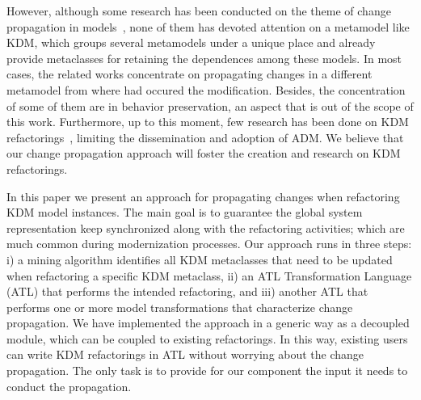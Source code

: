 However, although some research has been conducted on the theme of change propagation in models~\cite{4440135, Mens:2006:TMT:1706639.1706924, Mens:2006_NEW, Mens:2007, ICSOFT2014_Winetzhammer}, none of them has devoted attention on a metamodel like KDM, which groups several metamodels under a unique place and already provide metaclasses for retaining the dependences among these models. In most cases, the related works concentrate on propagating changes in a different metamodel from where had occured the modification. Besides, the concentration of some of them are in behavior preservation, an aspect that is out of the scope of this work. Furthermore, up to this moment, few research has been done on KDM refactorings~\cite{IRIDurelliCatalogo, 7051941}, limiting the dissemination and adoption of ADM. We believe that our change propagation approach will foster the creation and research on KDM refactorings. 


In this paper we present an approach for propagating changes when refactoring KDM model instances. The main goal is to guarantee the global system representation keep synchronized along with the refactoring activities; which are much common during modernization processes. Our approach runs in three steps: i) a mining algorithm identifies all KDM metaclasses that need to be updated when refactoring a specific KDM metaclass, ii) an ATL Transformation Language (ATL) that performs the intended refactoring, and iii) another ATL that performs one or more model transformations that characterize change propagation. We have implemented the approach in a generic way as a decoupled module, which can be coupled to existing refactorings. In this way, existing users can write KDM refactorings in ATL without worrying about the change propagation. The only task is to provide for our component the input it needs to conduct the propagation.

